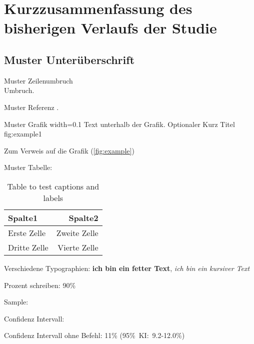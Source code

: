 
\section{Kurzzusammenfassung des bisherigen Verlaufs der Studie}

\subsection{Muster Unterüberschrift}

Muster Zeilenumbruch \\ Umbruch.

Muster Referenz \citep{morawetzHealthStatusHoney2019}.

Muster Grafik
  {width=0.1\textwidth} %
  {Text unterhalb der Grafik.} %
  {Optionaler Kurz Titel} %
  {fig:example1} %
  
Zum Verweis auf die Grafik (\cref{fig:example})
  
Muster Tabelle:

\begin{table}[htp]
    \centering
    \begin{tabular}{|l|r|} 
      \hline
      Spalte1 & Spalte2 \\
      \hline
      Erste Zelle & Zweite Zelle \\
      \hline
      Dritte Zelle & Vierte Zelle \\
      \hline
    \end{tabular}
    \caption{Table to test captions and labels}
    \label{tab:example}
\end{table}

Verschiedene Typographien: \textbf{ich bin ein fetter Text}, \textit{ich bin ein kursiver Text}

Prozent schreiben: 90\%

Sample: 

Confidenz Intervall:  %

Confidenz Intervall ohne Befehl: 11\% (95\%~KI:~9.2-12.0\%)
